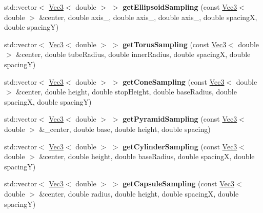 \begin{DoxyCompactItemize}
\item 
\hypertarget{namespacehokusai_ab8880d67e522852d5b7b94a55132a7fc}{std\+::vector$<$ \hyperlink{classhokusai_1_1Vec3}{Vec3}$<$ double $>$ $>$ {\bfseries get\+Ellipsoid\+Sampling} (const \hyperlink{classhokusai_1_1Vec3}{Vec3}$<$ double $>$ \&center, double axis\+\_, double axis\+\_, double axis\+\_, double spacing\+X, double spacing\+Y)}\label{namespacehokusai_ab8880d67e522852d5b7b94a55132a7fc}

\item 
\hypertarget{namespacehokusai_a97f6905b5c082a01152cfca1d823abf5}{std\+::vector$<$ \hyperlink{classhokusai_1_1Vec3}{Vec3}$<$ double $>$ $>$ {\bfseries get\+Torus\+Sampling} (const \hyperlink{classhokusai_1_1Vec3}{Vec3}$<$ double $>$ \&center, double tube\+Radius, double inner\+Radius, double spacing\+X, double spacing\+Y)}\label{namespacehokusai_a97f6905b5c082a01152cfca1d823abf5}

\item 
\hypertarget{namespacehokusai_a221a31ee62beafe7c66c276c4c77068c}{std\+::vector$<$ \hyperlink{classhokusai_1_1Vec3}{Vec3}$<$ double $>$ $>$ {\bfseries get\+Cone\+Sampling} (const \hyperlink{classhokusai_1_1Vec3}{Vec3}$<$ double $>$ \&center, double height, double stop\+Height, double base\+Radius, double spacing\+X, double spacing\+Y)}\label{namespacehokusai_a221a31ee62beafe7c66c276c4c77068c}

\item 
\hypertarget{namespacehokusai_aaaaf9e41c435b42c72349bf9f02b9762}{std\+::vector$<$ \hyperlink{classhokusai_1_1Vec3}{Vec3}$<$ double $>$ $>$ {\bfseries get\+Pyramid\+Sampling} (const \hyperlink{classhokusai_1_1Vec3}{Vec3}$<$ double $>$ \&\+\_\+center, double base, double height, double spacing)}\label{namespacehokusai_aaaaf9e41c435b42c72349bf9f02b9762}

\item 
\hypertarget{namespacehokusai_ab3b5da1876c3c918dcd72ae7c2a1efe1}{std\+::vector$<$ \hyperlink{classhokusai_1_1Vec3}{Vec3}$<$ double $>$ $>$ {\bfseries get\+Cylinder\+Sampling} (const \hyperlink{classhokusai_1_1Vec3}{Vec3}$<$ double $>$ \&center, double height, double base\+Radius, double spacing\+X, double spacing\+Y)}\label{namespacehokusai_ab3b5da1876c3c918dcd72ae7c2a1efe1}

\item 
\hypertarget{namespacehokusai_a9fc46514433a2790c703dbd6442d49fe}{std\+::vector$<$ \hyperlink{classhokusai_1_1Vec3}{Vec3}$<$ double $>$ $>$ {\bfseries get\+Capsule\+Sampling} (const \hyperlink{classhokusai_1_1Vec3}{Vec3}$<$ double $>$ \&center, double radius, double height, double spacing\+X, double spacing\+Y)}\label{namespacehokusai_a9fc46514433a2790c703dbd6442d49fe}


\end{DoxyCompactItemize}
